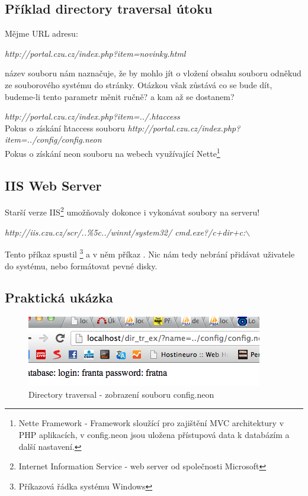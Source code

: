 \documentclass[12pt, a4paper]{report}
\begin{document}
\subsection{Příklad directory traversal útoku}
Mějme URL adresu:
\begin{center}
\textit{http://portal.czu.cz/index.php?item=novinky.html}
\end{center}
název souboru  nám naznačuje, že by mohlo jít o vložení obsahu souboru  odněkud ze souborového systému do stránky. Otázkou však zůstává co se bude dít, budeme-li tento parametr měnit ručně? a kam až se dostanem?
\begin{center}
\textit{http://portal.czu.cz/index.php?item=../.htaccess}\\
Pokus o získání \.htaccess souboru
\newline
\textit{http://portal.czu.cz/index.php?item=../config/config.neon}\\
Pokus o získání neon souboru na webech využívající Nette\footnote{Nette Framework - Framework sloužící pro zajištění MVC architektury v PHP aplikacích, v config.neon jsou uložena přístupová data k databázím a další nastavení.}
\end{center}

\subsection{IIS Web Server}
Starší verze IIS\footnote{Internet Information Service - web server od společnosti Microsoft} umožňovaly dokonce i vykonávat soubory na serveru!

\begin{center}
\textit{http://iis.czu.cz/scr/..\%5c../winnt/system32/ cmd.exe?/c+dir+c:$\backslash$}
\end{center}

Tento příkaz spustil \footnote{Příkazová řádka systému Windows} a v něm příkaz . Nic nám tedy nebrání přidávat uživatele do systému, nebo formátovat pevné disky.

\subsection{Praktická ukázka}
\begin{figure}[h!]
\includegraphics[width=390px]{./examples/dir_example.png}
\caption{Directory traversal - zobrazení souboru config.neon}
\label{obr.airbank}
\end{figure}
\end{document}
